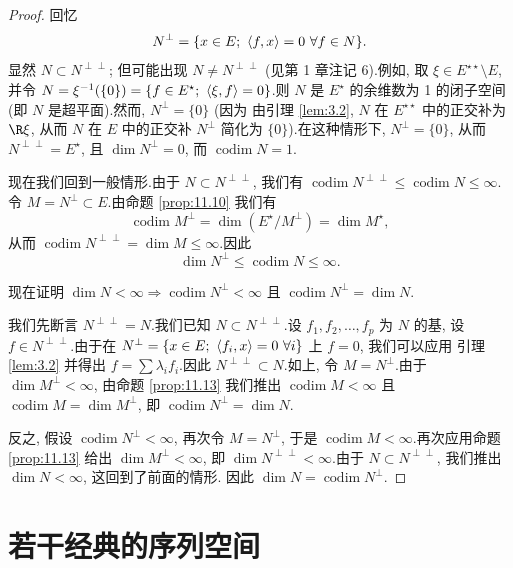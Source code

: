 \begin{proof}
回忆
\begin{equation*}
N^\perp=\{x\in E;\ \dual{f}{x}=0\ \forall f\in N\}.
\end{equation*}
显然 $N\subset N^{\perp\perp}$; 但可能出现 $N\ne N^{\perp\perp}$ (见第 1
章注记 6).例如, 取 $\xi\in E^{\star\star}\setminus E$, 并令
$N=\xi^{-1}(\{0\})=\{f\in E^\star;\ \dual{\xi}{f}=0\}$.则 $N$ 是 $E^\star$
的余维数为 1 的闭子空间 (即 $N$ 是超平面).然而, $N^\perp=\{0\}$ (因为
由引理  \ref{lem:3.2}, $N$ 在 $E^{\star\star}$ 中的正交补为 $\R\xi$, 从而
$N$ 在 $E$ 中的正交补 $N^\perp$ 简化为 $\{0\}$).在这种情形下,
$N^\perp=\{0\}$, 从而 $N^{\perp\perp}=E^\star$, 且 $\dim N^\perp=0$,
而 $\operatorname{codim}N=1$.

现在我们回到一般情形.由于 $N\subset N^{\perp\perp}$, 我们有
$\operatorname{codim}N^{\perp\perp}\le\operatorname{codim}N\le\infty$.令
$M=N^\perp\subset E$.由命题  \ref{prop:11.10} 我们有
\begin{equation*}
\operatorname{codim}M^\perp=\dim(E^\star/M^\perp)=\dim M^\star,
\end{equation*}
从而 $\operatorname{codim}N^{\perp\perp}=\dim M\le\infty$.因此
\begin{equation*}
\dim N^\perp\le\operatorname{codim}N\le\infty.
\end{equation*}

现在证明 $\dim N<\infty\Rightarrow\operatorname{codim}N^\perp<\infty$ 且
$\operatorname{codim}N^\perp=\dim N$.

我们先断言 $N^{\perp\perp}=N$.我们已知 $N\subset N^{\perp\perp}$.设
$f_1,f_2,\dots,f_p$ 为 $N$ 的基, 设 $f\in N^{\perp\perp}$.由于在
$N^\perp=\{x\in E;\ \left\langle f_i,x\right\rangle=0\ \forall i\}$ 上 $f=0$, 我们可以应用
引理  \ref{lem:3.2} 并得出 $f=\sum\lambda_if_i$.因此
$N^{\perp\perp}\subset N$.如上, 令 $M=N^\perp$.由于 $\dim M^\perp<\infty$,
由命题  \ref{prop:11.13} 我们推出 $\operatorname{codim}M<\infty$ 且
$\operatorname{codim}M=\dim M^\perp$, 即
$\operatorname{codim}N^\perp=\dim N$.

反之, 假设 $\operatorname{codim}N^\perp<\infty$, 再次令 $M=N^\perp$, 于是
$\operatorname{codim}M<\infty$.再次应用命题  \ref{prop:11.13} 给出
$\dim M^\perp<\infty$, 即 $\dim N^{\perp\perp}<\infty$.由于
$N\subset N^{\perp\perp}$, 我们推出 $\dim N<\infty$, 这回到了前面的情形.
因此 $\dim N=\operatorname{codim}N^\perp$.
\end{proof}
\section{若干经典的序列空间}
\label{sec:11.3}

